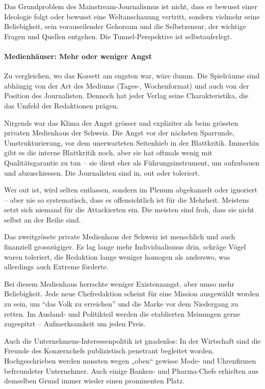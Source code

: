 Das Grundproblem des Mainstream-Journalismus ist nicht, dass er bewusst
einer Ideologie folgt oder bewusst eine Weltanschauung vertritt, sondern
vielmehr seine Beliebigkeit, sein vorauseilender Gehorsam und die
Selbstzensur, der wichtige Fragen und Quellen entgehen. Die
Tunnel-Perspektive ist selbstauferlegt.

\hypertarget{medienhuxe4user-mehr-oder-weniger-angst}{%
\paragraph{Medienhäuser: Mehr oder weniger
Angst}\label{medienhuxe4user-mehr-oder-weniger-angst}}

Zu vergleichen, wo das Korsett am engsten war, wäre dumm. Die Spielräume
sind abhängig von der Art des Mediums (Tages-, Wochenformat) und auch
von der Position des Journalisten. Dennoch hat jeder Verlag seine
Charakteristika, die das Umfeld der Redaktionen prägen.

Nirgends war das Klima der Angst grösser und expliziter als beim
grössten privaten Medienhaus der Schweiz. Die Angst vor der nächsten
Sparrunde, Umstrukturierung, vor dem unerwarteten Seitenhieb in der
Blattkritik. Immerhin gibt es die interne Blattkritik noch, aber sie hat
oftmals wenig mit Qualitätsgarantie zu tun -- sie dient eher als
Führungsinstrument, um aufzubauen und abzuschiessen. Die Journalisten
sind in, out oder toleriert.

Wer out ist, wird selten entlassen, sondern im Plenum abgekanzelt oder
ignoriert -- aber nie so systematisch, dass es offensichtlich ist für
die Mehrheit. Meistens setzt sich niemand für die Attackierten ein. Die
meisten sind froh, dass sie nicht selbst an der Reihe sind.

Das zweitgrösste private Medienhaus der Schweiz ist menschlich und auch
finanziell grosszügiger. Es lag lange mehr Individualismus drin, schräge
Vögel waren toleriert, die Redaktion lange weniger homogen als anderswo,
was allerdings auch Extreme förderte.

Bei diesem Medienhaus herrschte weniger Existenzangst, aber umso mehr
Beliebigkeit. Jede neue Chefredaktion scheint für eine Mission
ausgewählt worden zu sein, um ``das Volk zu erreichen'' und die Marke
vor dem Niedergang zu retten. Im Ausland- und Politikteil werden die
etablierten Meinungen gerne zugespitzt -- Aufmerksamkeit um jeden Preis.

Auch die Unternehmens-Interessenpolitik ist gnadenlos: In der Wirtschaft
sind die Freunde des Konzernchefs publizistisch penetrant begleitet
worden. Hochgeschrieben werden mussten wegen „oben`` gewisse Mode- und
Uhrenfirmen befreundeter Unternehmer. Auch einige Banken- und
Pharma-Chefs erhielten aus demselben Grund immer wieder einen
prominenten Platz.


